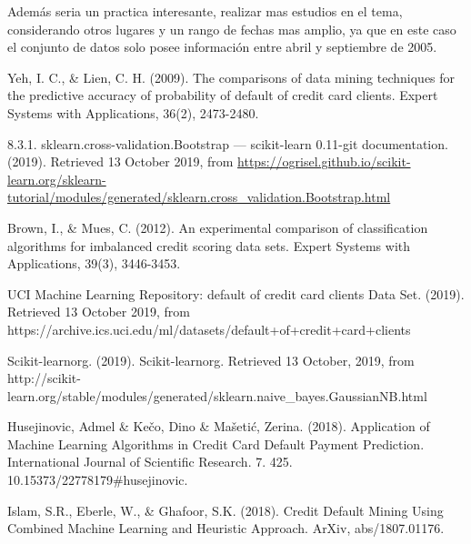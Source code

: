 \documentclass[conference]{IEEEtran}
\begin{document}
Además seria un practica interesante, realizar mas estudios en el tema, considerando otros lugares y un rango de fechas mas amplio, ya que en este caso el conjunto de datos solo posee información entre abril y septiembre de 2005.
\begin{thebibliography}{1}
  
Yeh, I. C., \& Lien, C. H. (2009). The comparisons of data mining techniques for the predictive accuracy of probability of default of credit card clients. Expert Systems with Applications, 36(2), 2473-2480.

8.3.1. sklearn.cross-validation.Bootstrap — scikit-learn 0.11-git documentation. (2019). Retrieved 13 October 2019, from \url{https://ogrisel.github.io/scikit-learn.org/sklearn-tutorial/modules/generated/sklearn.cross_validation.Bootstrap.html}

Brown, I., \& Mues, C. (2012). An experimental comparison of classification algorithms for imbalanced credit scoring data sets. Expert Systems with Applications, 39(3), 3446-3453.

 UCI Machine Learning Repository: default of credit card clients Data Set. (2019). Retrieved 13 October 2019, from https://archive.ics.uci.edu/ml/datasets/default+of+credit+card+clients

Scikit-learnorg. (2019). Scikit-learnorg. Retrieved 13 October, 2019, from http://scikit-learn.org/stable/modules/generated/sklearn.naive\_bayes.GaussianNB.html



 Husejinovic, Admel \& Kečo, Dino \& Mašetić, Zerina. (2018). Application of Machine Learning Algorithms in Credit Card Default Payment Prediction. International Journal of Scientific Research. 7. 425. 10.15373/22778179\#husejinovic.
 
Islam, S.R., Eberle, W., \& Ghafoor, S.K. (2018). Credit Default Mining Using Combined Machine Learning and Heuristic Approach. ArXiv, abs/1807.01176.


\end{thebibliography}
\end{document}
